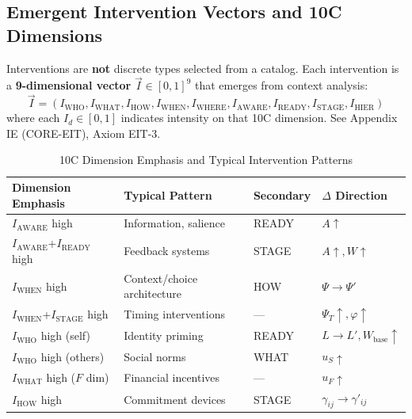\subsection{Emergent Intervention Vectors and 10C Dimensions}

\begin{tcolorbox}[colback=blue!5!white, colframe=blue!75!black, title=\textbf{Key Insight: Interventions Emerge from Continuous 10C Space}]
Interventions are \textbf{not} discrete types selected from a catalog. Each intervention is a \textbf{9-dimensional vector} $\vec{I} \in [0,1]^9$ that emerges from context analysis:
\begin{equation}
\vec{I} = (I_{\text{WHO}}, I_{\text{WHAT}}, I_{\text{HOW}}, I_{\text{WHEN}}, I_{\text{WHERE}}, I_{\text{AWARE}}, I_{\text{READY}}, I_{\text{STAGE}}, I_{\text{HIER}})
\end{equation}
where each $I_d \in [0,1]$ indicates intensity on that 10C dimension. See Appendix IE (CORE-EIT), Axiom EIT-3.
\end{tcolorbox}

\begin{table}[htbp]
\centering
\caption{10C Dimension Emphasis and Typical Intervention Patterns}
\label{tab:hhh-type-to-9c}
\renewcommand{\arraystretch}{1.3}
\small
\begin{tabular}{@{}llll@{}}
\toprule
\textbf{Dimension Emphasis} & \textbf{Typical Pattern} & \textbf{Secondary} & \textbf{$\Delta$ Direction} \\
\midrule
$I_{\text{AWARE}}$ high & Information, salience & READY & $A \uparrow$ \\
$I_{\text{AWARE}}$+$I_{\text{READY}}$ high & Feedback systems & STAGE & $A \uparrow, W \uparrow$ \\
$I_{\text{WHEN}}$ high & Context/choice architecture & HOW & $\Psi \rightarrow \Psi'$ \\
$I_{\text{WHEN}}$+$I_{\text{STAGE}}$ high & Timing interventions & --- & $\Psi_T \uparrow, \varphi \uparrow$ \\
$I_{\text{WHO}}$ high (self) & Identity priming & READY & $L \rightarrow L', W_{\text{base}} \uparrow$ \\
$I_{\text{WHO}}$ high (others) & Social norms & WHAT & $u_S \uparrow$ \\
$I_{\text{WHAT}}$ high ($F$ dim) & Financial incentives & --- & $u_F \uparrow$ \\
$I_{\text{HOW}}$ high & Commitment devices & STAGE & $\gamma_{ij} \rightarrow \gamma'_{ij}$ \\
\bottomrule
\end{tabular}
\end{table}

